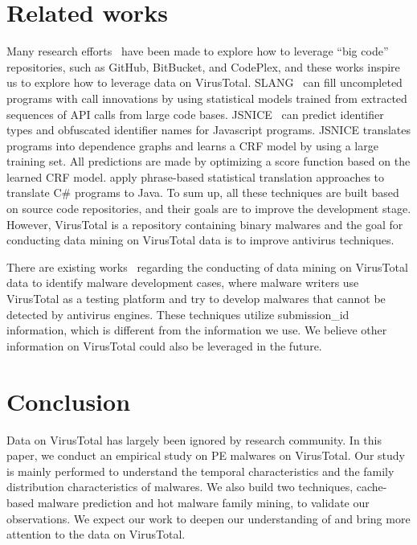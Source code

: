 \section{Related works}

Many research efforts~\cite{bigcode, big-lessons,big-translation,code-completion,big-predicting} 
have been made to explore how to leverage ``big code'' repositories, 
such as GitHub, BitBucket, and CodePlex, and these works inspire us to explore how to leverage data on VirusTotal. 
SLANG~\cite{code-completion} can fill uncompleted programs with call innovations 
by using statistical models trained from extracted sequences of API calls from large code bases.  
JSNICE~\cite{big-predicting} can predict identifier types and obfuscated identifier names for Javascript programs. 
JSNICE translates programs into dependence graphs and learns a CRF model by using a large training set. 
All predictions are made by optimizing a score function based on the learned CRF model. 
\citet{big-translation} apply phrase-based statistical translation approaches to translate C\# programs to Java.
To sum up, all these techniques are built based on source code repositories, 
and their goals are to improve the development stage. 
However, VirusTotal is a repository containing binary malwares
and the goal for conducting data mining on VirusTotal data is to improve antivirus techniques. 

There are existing works~\cite{hacker-vt,neeles} regarding the conducting of data mining on VirusTotal data to identify malware development cases, 
where malware writers use VirusTotal as a testing platform and 
try to develop malwares that cannot be detected by antivirus engines. 
These techniques utilize submission\_id information, which is different from the information we use. 
We believe other information on VirusTotal could also be leveraged in the future. 


\section{Conclusion}
Data on VirusTotal has largely been ignored by research community. 
In this paper, we conduct an empirical study on PE malwares on VirusTotal. 
Our study is mainly performed to understand the temporal characteristics and
the family distribution characteristics of malwares. We also build two techniques, 
cache-based malware prediction and hot malware family mining, to validate our observations. 
We expect our work to deepen our understanding of and bring more attention to the data on VirusTotal. 